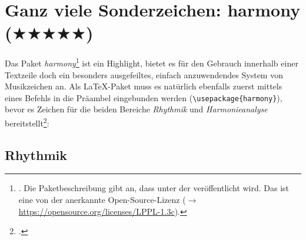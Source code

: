 %
%
%




\section{Ganz viele Sonderzeichen: harmony ($\bigstar\bigstar\bigstar\bigstar\bigstar$)}

Das Paket \textit{harmony}\footnote{\cite[vgl.][\nopage wp]{CtanHarmony2018a}.
Die Paketbeschreibung gibt an, dass  unter der  veröffentlicht wird. Das ist eine von der  anerkannte
Open-Source-Lizenz ($\rightarrow$ \href{https://opensource.org/licenses/LPPL-1.3c}
{https://opensource.org/licenses/LPPL-1.3c}).} ist ein Highlight, bietet es für
den Gebrauch innerhalb einer Textzeile doch ein besonders ausgefeiltes, einfach
anzuwendendes System von Musikzeichen an. Als \LaTeX-Paket muss es natürlich
ebenfalls zuerst mittels eines Befehls in die Präambel eingebunden werden
(\small \texttt{\textbackslash{usepackage\{harmony\}}}), bevor es Zeichen für die beiden
Bereiche \textit{Rhythmik} und \textit{Harmonieanalyse}
bereitstellt\footcite[Für einen vollen Überblick über den Zeichenvorrat und die
Kombinationsmöglichkeiten vgl.][4ff]{WegWeg2007a}:

\subsection{\small Rhythmik}

